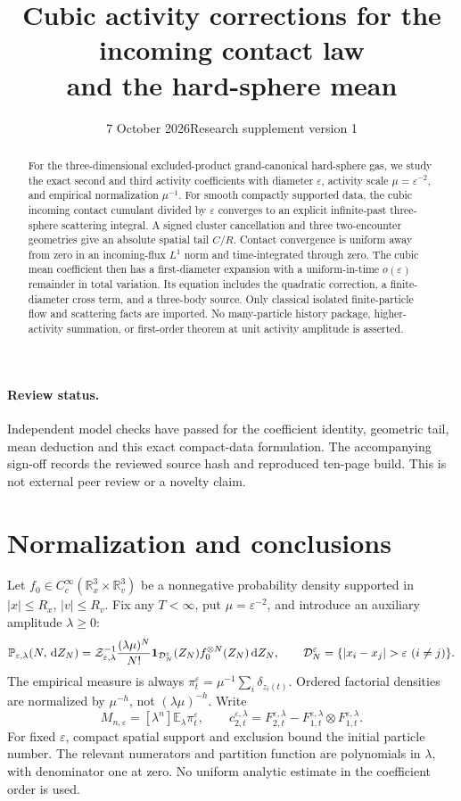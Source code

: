 \documentclass[11pt,letterpaper]{article}
\title{Cubic activity corrections for the incoming contact law\\and the hard-sphere mean}
\author{}\date{7 October 2026\quad Research supplement version 1}
\theoremstyle{remark}\newtheorem{remark}[theorem]{Remark}
\numberwithin{equation}{section}
\newcommand{\R}{\mathbb R}\newcommand{\eps}{\varepsilon}\newcommand{\dd}{\,\mathrm d}
\newcommand{\E}{\mathbb E}\newcommand{\ind}{\mathbf1}\newcommand{\TV}{\mathrm{TV}}
\begin{document}
\maketitle
\begin{abstract}
For the three-dimensional excluded-product grand-canonical hard-sphere gas, we study the exact second and third activity coefficients with diameter $\eps$, activity scale $\mu=\eps^{-2}$, and empirical normalization $\mu^{-1}$. For smooth compactly supported data, the cubic incoming contact cumulant divided by $\eps$ converges to an explicit infinite-past three-sphere scattering integral. A signed cluster cancellation and three two-encounter geometries give an absolute spatial tail $C/R$. Contact convergence is uniform away from zero in an incoming-flux $L^1$ norm and time-integrated through zero. The cubic mean coefficient then has a first-diameter expansion with a uniform-in-time $o(\eps)$ remainder in total variation. Its equation includes the quadratic correction, a finite-diameter cross term, and a three-body source. Only classical isolated finite-particle flow and scattering facts are imported. No many-particle history package, higher-activity summation, or first-order theorem at unit activity amplitude is asserted.
\end{abstract}
\paragraph{Review status.} Independent model checks have passed for the coefficient identity, geometric tail, mean deduction and this exact compact-data formulation. The accompanying sign-off records the reviewed source hash and reproduced ten-page build. This is not external peer review or a novelty claim.
\tableofcontents

\section{Normalization and conclusions}
Let $f_0\in C_c^\infty(\R_x^3\times\R_v^3)$ be a nonnegative probability density supported in $|x|\le R_x$, $|v|\le R_v$. Fix any $T<\infty$, put $\mu=\eps^{-2}$, and introduce an auxiliary amplitude $\lambda\ge0$:
\begin{equation}\label{eq:law}
 \mathbb P_{\eps,\lambda}(N,\dd Z_N)=\mathcal Z_{\eps,\lambda}^{-1}
 \frac{(\lambda\mu)^N}{N!}\ind_{\D_N^\eps}(Z_N)f_0^{\otimes N}(Z_N)\dd Z_N,
 \qquad \D_N^\eps=\{|x_i-x_j|>\eps\ (i\ne j)\}.
\end{equation}
The empirical measure is always $\pi_t^\eps=\mu^{-1}\sum_i\delta_{z_i(t)}$. Ordered factorial densities are normalized by $\mu^{-h}$, not $(\lambda\mu)^{-h}$. Write
\[
 M_{n,\eps}=[\lambda^n]\E_\lambda\pi_t^\eps,\qquad
 c_{2,t}^{\eps,\lambda}=F_{2,t}^{\eps,\lambda}
           -F_{1,t}^{\eps,\lambda}\otimes F_{1,t}^{\eps,\lambda}.
\]
For fixed $\eps$, compact spatial support and exclusion bound the initial particle number. The relevant numerators and partition function are polynomials in $\lambda$, with denominator one at zero. No uniform analytic estimate in the coefficient order is used.
\end{document}
